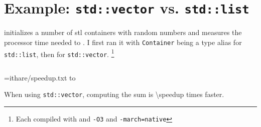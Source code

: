 \section{Example: \texttt{std::vector} vs. \texttt{std::list}}

 initializes a number of \acrshort{stl} containers
with random numbers and measures the processor time needed to .
%
I first ran it with \texttt{Container} being a type alias for
\texttt{std::list}, then for \texttt{std::vector}.%
\footnote{%
   Each compiled with  and \texttt{-O3} and
   \texttt{-march=native}
}

\begin{center}
   \inputminted[firstline=20]{cpp}{ithare/list-vs-vector.cpp}
   \label{lst:ithare}
\end{center}

\newread\file
\openin\file=ithare/speedup.txt
\read\file to \speedup
\closein\file


When using \texttt{std::vector}, computing the sum is
\num[round-mode=places, round-precision=0]{\speedup} times faster.

